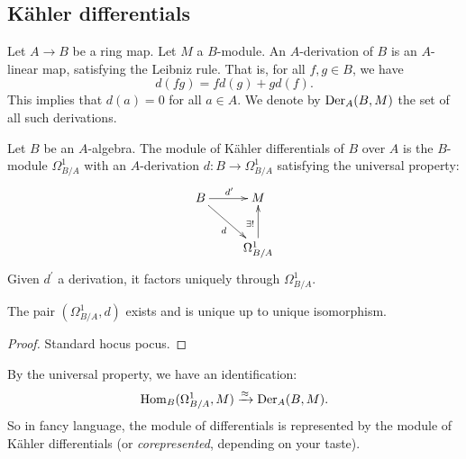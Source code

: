 \documentclass[11pt, english]{article}
\begin{document}
\subsection{Kähler differentials}

Let $A \to B$ be a ring map. Let $M$ a $B$-module. An $A$-derivation of $B$ is an $A$-linear map, satisfying the Leibniz rule. That is, for all $f,g \in B$, we have
\[
d(fg) = fd(g) + gd(f).
\]
This implies that $d(a)=0$ for all $a \in A$. We denote by $\operatorname{Der}_A(B,M)$ the set of all such derivations.

\begin{defi}
Let $B$ be an $A$-algebra. The module of Kähler differentials of $B$ over $A$ is the $B$-module $\Omega_{B/A}^1$ with an $A$-derivation $d:B \to \Omega_{B/A}^1$ satisfying the universal property:
\[
\xymatrix{
B \ar[r]^{d^\prime} \ar[dr]_d & M \\
& \Omega_{B/A}^1 \ar[u]^{\exists ! }
}
\]
Given $d^\prime$ a derivation, it factors uniquely through $\Omega_{B/A}^1$.
\end{defi}

\begin{prop}
The pair $(\Omega_{B/A}^1,d)$ exists and is unique up to unique isomorphism.
\end{prop}
\begin{proof}
Standard hocus pocus.
\end{proof}

By the universal property, we have an identification:
\[
\operatorname{Hom}_B(\Omega_{B/A}^1,M) \xrightarrow{\approx} \operatorname{Der}_A(B,M).
\]
So in fancy language, the module of differentials is represented by the module of Kähler differentials (or \emph{corepresented}, depending on your taste).
\end{document}
